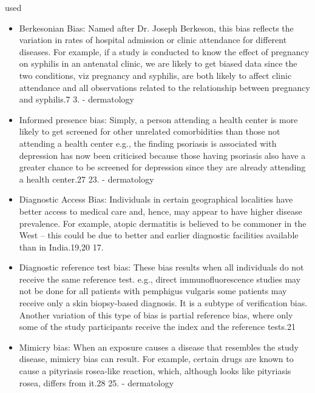 \begin{refsection}
		
		
		\rawcitationstart
		used
		\begin{itemize}		
			\rawcitationusedstart
			\item Berkesonian Bias: Named after Dr. Joseph Berkeson, this bias reflects the variation in rates of hospital admission or clinic attendance for different diseases. For example, if a study is conducted to know the effect of pregnancy on syphilis in an antenatal clinic, we are likely to get biased data since the two conditions, viz pregnancy and syphilis, are both likely to affect clinic attendance and all observations related to the relationship between pregnancy and syphilis.7 3. \autocite{Chakraborty_2024} - dermatology
			
			\item  Informed presence bias: Simply, a person attending a health center is more likely to get screened for other unrelated comorbidities than those not attending a health center e.g., the finding psoriasis is associated with depression has now been criticised because those having psoriasis also have a greater chance to be screened for depression since they are already attending a health center.27 23. \autocite{Chakraborty_2024} - dermatology	
			
			\item  Diagnostic Access Bias: Individuals in certain geographical localities have better access to medical care and, hence, may appear to have higher disease prevalence. For example, atopic dermatitis is believed to be commoner in the West – this could be due to better and earlier diagnostic facilities available than in India.19,20 17.\autocite{Chakraborty_2024}
			
			\item  Diagnostic reference test bias: These bias results when all individuals do not receive the same reference test. e.g., direct immunofluorescence studies may not be done for all patients with pemphigus vulgaris some patients may receive only a skin biopsy-based diagnosis. It is a subtype of verification bias. Another variation of this type of bias is partial reference bias, where only some of the study participants receive the index and the reference tests.21\autocite{Chakraborty_2024}
			
			\item  Mimicry bias: When an exposure causes a disease that resembles the study disease, mimicry bias can result. For example, certain drugs are known to cause a pityriasis rosea-like reaction, which, although looks like pityriasis rosea, differs from it.28 25.\autocite{Chakraborty_2024} - dermatology
			

\end{itemize}
\end{refsection}
